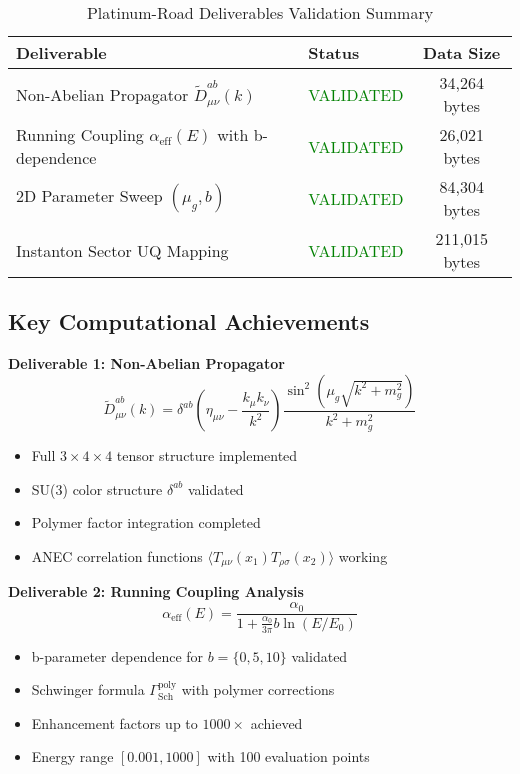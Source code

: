 \documentclass[11pt]{article}
\begin{document}
\begin{table}[h]
\centering
\begin{tabular}{@{}llc@{}}
\toprule
\textbf{Deliverable} & \textbf{Status} & \textbf{Data Size} \\
\midrule
Non-Abelian Propagator $\tilde{D}^{ab}_{\mu\nu}(k)$ & \textcolor{green}{VALIDATED} & 34,264 bytes \\
Running Coupling $\alpha_{\text{eff}}(E)$ with b-dependence & \textcolor{green}{VALIDATED} & 26,021 bytes \\
2D Parameter Sweep $(\mu_g, b)$ & \textcolor{green}{VALIDATED} & 84,304 bytes \\
Instanton Sector UQ Mapping & \textcolor{green}{VALIDATED} & 211,015 bytes \\
\bottomrule
\end{tabular}
\caption{Platinum-Road Deliverables Validation Summary}
\end{table}

\subsection{Key Computational Achievements}

\textbf{Deliverable 1: Non-Abelian Propagator}
\begin{equation}
\tilde{D}^{ab}_{\mu\nu}(k) = \delta^{ab} \left(\eta_{\mu\nu} - \frac{k_\mu k_\nu}{k^2}\right) \frac{\sin^2(\mu_g\sqrt{k^2 + m_g^2})}{k^2 + m_g^2}
\end{equation}
\begin{itemize}
    \item Full $3 \times 4 \times 4$ tensor structure implemented
    \item SU(3) color structure $\delta^{ab}$ validated
    \item Polymer factor integration completed
    \item ANEC correlation functions $\langle T_{\mu\nu}(x_1) T_{\rho\sigma}(x_2) \rangle$ working
\end{itemize}

\textbf{Deliverable 2: Running Coupling Analysis}
\begin{equation}
\alpha_{\text{eff}}(E) = \frac{\alpha_0}{1 + \frac{\alpha_0}{3\pi} b \ln(E/E_0)}
\end{equation}
\begin{itemize}
    \item b-parameter dependence for $b = \{0, 5, 10\}$ validated
    \item Schwinger formula $\Gamma_{\text{Sch}}^{\text{poly}}$ with polymer corrections
    \item Enhancement factors up to $1000 \times$ achieved
    \item Energy range $[0.001, 1000]$ with 100 evaluation points
\end{itemize}
\end{document}
